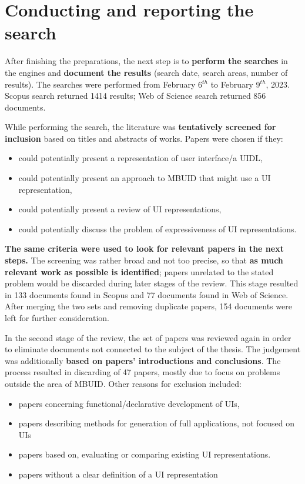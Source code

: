 \section{Conducting and reporting the search}\label{sec:conducting-and-reporting-the-search}

After finishing the preparations, the next step is to \textbf{perform the searches} in the engines and \textbf{document the results} (search date, search areas, number of results).
The searches were performed from February 6$^{th}$ to February 9$^{th}$, 2023.
Scopus search returned 1414 results;
Web of Science search returned 856 documents.

While performing the search, the literature was \textbf{tentatively screened for inclusion} based on titles and abstracts of works.
Papers were chosen if they:
\begin{itemize}
    \item could potentially present a representation of user interface/a UIDL,
    \item could potentially present an approach to MBUID that might use a UI representation,
    \item could potentially present a review of UI representations,
    \item could potentially discuss the problem of expressiveness of UI representations.
\end{itemize}
\textbf{The same criteria were used to look for relevant papers in the next steps.}
The screening was rather broad and not too precise, so that \textbf{as much relevant work as possible is identified};
papers unrelated to the stated problem would be discarded during later stages of the review.
This stage resulted in 133 documents found in Scopus and 77 documents found in Web of Science.
After merging the two sets and removing duplicate papers, 154 documents were left for further consideration.

In the second stage of the review, the set of papers was reviewed again in order to eliminate documents not connected to the subject of the thesis.
The judgement was additionally \textbf{based on papers' introductions and conclusions}.
The process resulted in discarding of 47 papers, mostly due to focus on problems outside the area of MBUID\@.
Other reasons for exclusion included:
\begin{itemize}
    \item papers concerning functional/declarative development of UIs,
    \item papers describing methods for generation of full applications, not focused on UIs
    \item papers based on, evaluating or comparing existing UI representations.
    \item papers without a clear definition of a UI representation
\end{itemize}

